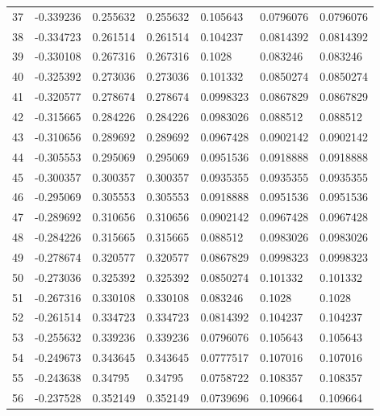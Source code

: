 \begin{longtable}{l|lll|lll}
  37 & -0.339236    & 0.255632    & 0.255632    &  0.105643    & 0.0796076   & 0.0796076   \\
  38 & -0.334723    & 0.261514    & 0.261514    &  0.104237    & 0.0814392   & 0.0814392   \\
  39 & -0.330108    & 0.267316    & 0.267316    &  0.1028      & 0.083246    & 0.083246    \\
  40 & -0.325392    & 0.273036    & 0.273036    &  0.101332    & 0.0850274   & 0.0850274   \\
  41 & -0.320577    & 0.278674    & 0.278674    &  0.0998323   & 0.0867829   & 0.0867829   \\
  42 & -0.315665    & 0.284226    & 0.284226    &  0.0983026   & 0.088512    & 0.088512    \\
  43 & -0.310656    & 0.289692    & 0.289692    &  0.0967428   & 0.0902142   & 0.0902142   \\
  44 & -0.305553    & 0.295069    & 0.295069    &  0.0951536   & 0.0918888   & 0.0918888   \\
  45 & -0.300357    & 0.300357    & 0.300357    &  0.0935355   & 0.0935355   & 0.0935355   \\
  46 & -0.295069    & 0.305553    & 0.305553    &  0.0918888   & 0.0951536   & 0.0951536   \\
  47 & -0.289692    & 0.310656    & 0.310656    &  0.0902142   & 0.0967428   & 0.0967428   \\
  48 & -0.284226    & 0.315665    & 0.315665    &  0.088512    & 0.0983026   & 0.0983026   \\
  49 & -0.278674    & 0.320577    & 0.320577    &  0.0867829   & 0.0998323   & 0.0998323   \\
  50 & -0.273036    & 0.325392    & 0.325392    &  0.0850274   & 0.101332    & 0.101332    \\
  51 & -0.267316    & 0.330108    & 0.330108    &  0.083246    & 0.1028      & 0.1028      \\
  52 & -0.261514    & 0.334723    & 0.334723    &  0.0814392   & 0.104237    & 0.104237    \\
  53 & -0.255632    & 0.339236    & 0.339236    &  0.0796076   & 0.105643    & 0.105643    \\
  54 & -0.249673    & 0.343645    & 0.343645    &  0.0777517   & 0.107016    & 0.107016    \\
  55 & -0.243638    & 0.34795     & 0.34795     &  0.0758722   & 0.108357    & 0.108357    \\
  56 & -0.237528    & 0.352149    & 0.352149    &  0.0739696   & 0.109664    & 0.109664    \\

\end{longtable}
